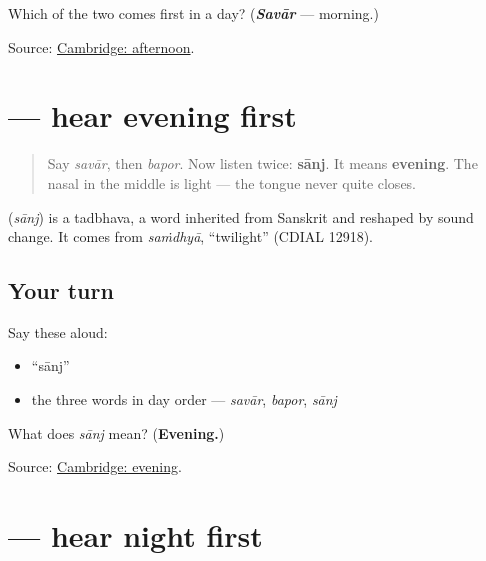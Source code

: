 \begin{tcolorbox}[breakable,colback=teal!4,colframe=teal!35!black,title={Before you move on}]
Which of the two comes first in a day? (\emph{\textbf{Savār}} — morning.)

Source: \href{https://dictionary.cambridge.org/dictionary/english-gujarati/afternoon}{Cambridge: afternoon}.
\end{tcolorbox}
\section[\texorpdfstring{\gu{સાંજ} (sānj)}{સાંજ (sānj)}]{ — hear evening first}

\label{lesson:GU-C24-hear-saanj}



\begin{quote}
Say \emph{savār}, then \emph{bapor}. Now listen twice: \textbf{sānj}. It means \textbf{evening}. The nasal in the middle is light — the tongue never quite closes.
\end{quote}

\begin{cousinweb}
\textbf{} (\emph{sānj}) is a tadbhava, a word inherited from Sanskrit and reshaped by sound change. It comes from \emph{saṁdhyā}, \textquotedblleft{}twilight\textquotedblright{} (CDIAL 12918).
\end{cousinweb}

\subsection*{Your turn}
Say these aloud:

\begin{itemize}
\raggedright
  \item \textquotedblleft{}sānj\textquotedblright{}
  \item the three words in day order — \emph{savār}, \emph{bapor}, \emph{sānj}
\end{itemize}

\begin{tcolorbox}[breakable,colback=teal!4,colframe=teal!35!black,title={Before you move on}]
What does \emph{sānj} mean? (\textbf{Evening.})

Source: \href{https://dictionary.cambridge.org/dictionary/english-gujarati/evening}{Cambridge: evening}.
\end{tcolorbox}
\section[\texorpdfstring{\gu{રાત} (rāt)}{રાત (rāt)}]{ — hear night first}


